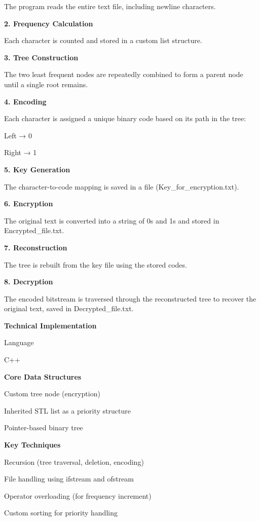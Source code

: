 The program reads the entire text file, including newline characters.

{\bfseries{2. Frequency Calculation}}

Each character is counted and stored in a custom list structure.

{\bfseries{3. Tree Construction}}

The two least frequent nodes are repeatedly combined to form a parent node until a single root remains.

{\bfseries{4. Encoding}}

Each character is assigned a unique binary code based on its path in the tree:\+

Left → 0

Right → 1

{\bfseries{5. Key Generation}}

The character-\/to-\/code mapping is saved in a file (Key\+\_\+for\+\_\+encryption.\+txt).

{\bfseries{6. Encryption}}

The original text is converted into a string of 0s and 1s and stored in Encrypted\+\_\+file.\+txt.

{\bfseries{7. Reconstruction}}

The tree is rebuilt from the key file using the stored codes.

{\bfseries{8. Decryption}}

The encoded bitstream is traversed through the reconstructed tree to recover the original text, saved in Decrypted\+\_\+file.\+txt.

{\bfseries{Technical Implementation}}


\begin{DoxyItemize}
\item Language
\item C++
\end{DoxyItemize}

{\bfseries{Core Data Structures}}


\begin{DoxyItemize}
\item Custom tree node (encryption)
\item Inherited STL list as a priority structure
\item Pointer-\/based binary tree
\end{DoxyItemize}

{\bfseries{Key Techniques}}


\begin{DoxyEnumerate}
\item Recursion (tree traversal, deletion, encoding)
\item File handling using ifstream and ofstream
\item Operator overloading (for frequency increment)
\item Custom sorting for priority handling
\end{DoxyEnumerate}

